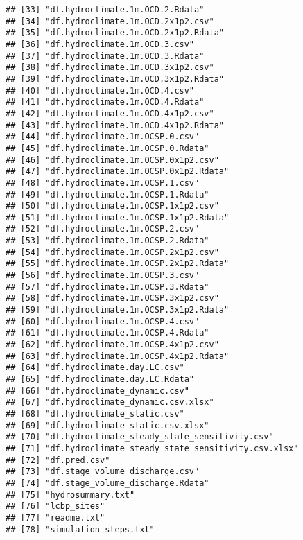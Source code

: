 \documentclass[
]{article}
\begin{document}
\begin{verbatim}
## [33] "df.hydroclimate.1m.OCD.2.Rdata"                   
## [34] "df.hydroclimate.1m.OCD.2x1p2.csv"                 
## [35] "df.hydroclimate.1m.OCD.2x1p2.Rdata"               
## [36] "df.hydroclimate.1m.OCD.3.csv"                     
## [37] "df.hydroclimate.1m.OCD.3.Rdata"                   
## [38] "df.hydroclimate.1m.OCD.3x1p2.csv"                 
## [39] "df.hydroclimate.1m.OCD.3x1p2.Rdata"               
## [40] "df.hydroclimate.1m.OCD.4.csv"                     
## [41] "df.hydroclimate.1m.OCD.4.Rdata"                   
## [42] "df.hydroclimate.1m.OCD.4x1p2.csv"                 
## [43] "df.hydroclimate.1m.OCD.4x1p2.Rdata"               
## [44] "df.hydroclimate.1m.OCSP.0.csv"                    
## [45] "df.hydroclimate.1m.OCSP.0.Rdata"                  
## [46] "df.hydroclimate.1m.OCSP.0x1p2.csv"                
## [47] "df.hydroclimate.1m.OCSP.0x1p2.Rdata"              
## [48] "df.hydroclimate.1m.OCSP.1.csv"                    
## [49] "df.hydroclimate.1m.OCSP.1.Rdata"                  
## [50] "df.hydroclimate.1m.OCSP.1x1p2.csv"                
## [51] "df.hydroclimate.1m.OCSP.1x1p2.Rdata"              
## [52] "df.hydroclimate.1m.OCSP.2.csv"                    
## [53] "df.hydroclimate.1m.OCSP.2.Rdata"                  
## [54] "df.hydroclimate.1m.OCSP.2x1p2.csv"                
## [55] "df.hydroclimate.1m.OCSP.2x1p2.Rdata"              
## [56] "df.hydroclimate.1m.OCSP.3.csv"                    
## [57] "df.hydroclimate.1m.OCSP.3.Rdata"                  
## [58] "df.hydroclimate.1m.OCSP.3x1p2.csv"                
## [59] "df.hydroclimate.1m.OCSP.3x1p2.Rdata"              
## [60] "df.hydroclimate.1m.OCSP.4.csv"                    
## [61] "df.hydroclimate.1m.OCSP.4.Rdata"                  
## [62] "df.hydroclimate.1m.OCSP.4x1p2.csv"                
## [63] "df.hydroclimate.1m.OCSP.4x1p2.Rdata"              
## [64] "df.hydroclimate.day.LC.csv"                       
## [65] "df.hydroclimate.day.LC.Rdata"                     
## [66] "df.hydroclimate_dynamic.csv"                      
## [67] "df.hydroclimate_dynamic.csv.xlsx"                 
## [68] "df.hydroclimate_static.csv"                       
## [69] "df.hydroclimate_static.csv.xlsx"                  
## [70] "df.hydroclimate_steady_state_sensitivity.csv"     
## [71] "df.hydroclimate_steady_state_sensitivity.csv.xlsx"
## [72] "df.pred.csv"                                      
## [73] "df.stage_volume_discharge.csv"                    
## [74] "df.stage_volume_discharge.Rdata"                  
## [75] "hydrosummary.txt"                                 
## [76] "lcbp_sites"                                       
## [77] "readme.txt"                                       
## [78] "simulation_steps.txt"
\end{verbatim}
\end{document}
